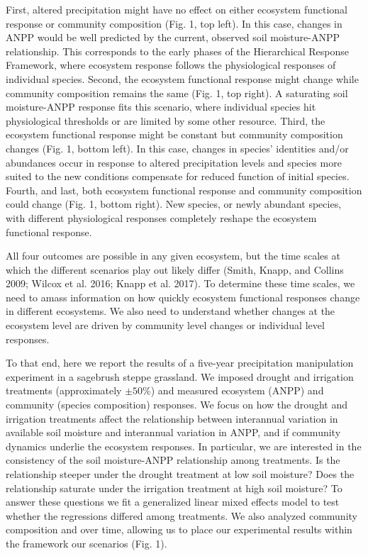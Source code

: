 \documentclass[fleqn,10pt,lineno]{wlpeerj} %
\begin{document}
First, altered precipitation might have no effect on either ecosystem
functional response or community composition (Fig. 1, top left). In this
case, changes in ANPP would be well predicted by the current, observed
soil moisture-ANPP relationship. This corresponds to the early phases of
the Hierarchical Response Framework, where ecosystem response follows
the physiological responses of individual species. Second, the ecosystem
functional response might change while community composition remains the
same (Fig. 1, top right). A saturating soil moisture-ANPP response fits
this scenario, where individual species hit physiological thresholds or
are limited by some other resource. Third, the ecosystem functional
response might be constant but community composition changes (Fig. 1,
bottom left). In this case, changes in species' identities and/or
abundances occur in response to altered precipitation levels and species
more suited to the new conditions compensate for reduced function of
initial species. Fourth, and last, both ecosystem functional response
and community composition could change (Fig. 1, bottom right). New
species, or newly abundant species, with different physiological
responses completely reshape the ecosystem functional response.

All four outcomes are possible in any given ecosystem, but the time
scales at which the different scenarios play out likely differ (Smith,
Knapp, and Collins 2009; Wilcox et al. 2016; Knapp et al. 2017). To
determine these time scales, we need to amass information on how quickly
ecosystem functional responses change in different ecosystems. We also
need to understand whether changes at the ecosystem level are driven by
community level changes or individual level responses.

To that end, here we report the results of a five-year precipitation
manipulation experiment in a sagebrush steppe grassland. We imposed
drought and irrigation treatments (approximately \(\pm50\%\)) and
measured ecosystem (ANPP) and community (species composition) responses.
We focus on how the drought and irrigation treatments affect the
relationship between interannual variation in available soil moisture
and interannual variation in ANPP, and if community dynamics underlie
the ecosystem responses. In particular, we are interested in the
consistency of the soil moisture-ANPP relationship among treatments. Is
the relationship steeper under the drought treatment at low soil
moisture? Does the relationship saturate under the irrigation treatment
at high soil moisture? To answer these questions we fit a generalized
linear mixed effects model to test whether the regressions differed
among treatments. We also analyzed community composition and
 over
time, allowing us to place our experimental results within the framework
our scenarios (Fig. 1).
\end{document}
